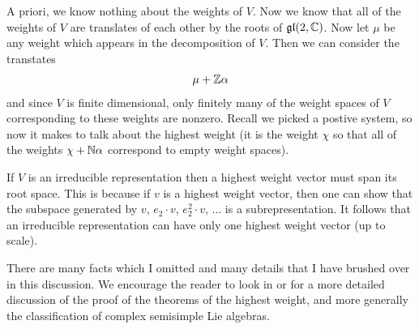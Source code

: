 \documentclass{amsart}
\numberwithin{equation}{section}
\theoremstyle{plain} %
\theoremstyle{definition}
\theoremstyle{remark}
\begin{document}
A priori, we know nothing about the weights of $V$. Now we know that all of the weights of $V$ are translates of each other by the roots of 
$\operatorname{\mathfrak{gl}}(2,\mathbb{C})$. Now let $\mu$ be any weight which appears in the decomposition of $V$. Then we can consider the transtates \begin{align*}
    \mu + \mathbb{Z}\alpha
\end{align*} and since $V$ is finite dimensional, only finitely many of the weight spaces of $V$ corresponding to these weights are nonzero. 
Recall we picked a postive system, so now it makes to talk about the highest weight (it is the weight $\chi$ so that all of the weights $\chi + \mathbb{N}\alpha$ 
correspond to empty weight spaces).

\hfill

If $V$ is an irreducible representation then a highest weight vector must span its root space. This is because
if $v$ is a highest weight vector, then one can show that the subspace generated by $v$, $e_2\cdot v$, $e_2^2\cdot v$, $\ldots$ is a subrepresentation.
It follows that an irreducible representation can have only one highest weight vector (up to scale).

\hfill

There are many facts which I omitted and many details that I have brushed over in this discussion. We encourage
the reader to look in \cite{fulton} or \cite{fulton-harris} for a more detailed discussion of the proof of the theorems of the highest weight, 
and more generally the classification of complex semisimple Lie algebras.












\begin{bibdiv}
  \begin{biblist}





  \end{biblist}
\end{bibdiv}
\end{document}
